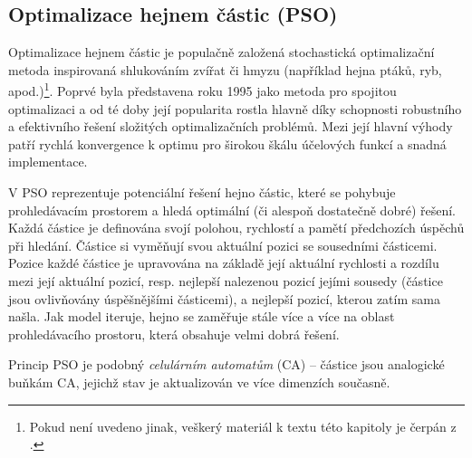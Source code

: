 \documentclass[a4paper,12pt]{article}
\begin{document}
\subsection{Optimalizace hejnem částic (PSO)}
Optimalizace hejnem částic je populačně založená stochastická optimalizační metoda inspirovaná
shlukováním zvířat či hmyzu (například hejna ptáků, ryb, apod.)\footnote{Pokud není uvedeno jinak,
veškerý materiál k textu této kapitoly je čerpán z \cite{Blum08SwarmOpt}.}.
Poprvé byla představena roku 1995 jako metoda pro spojitou optimalizaci a od té doby
její popularita rostla hlavně díky schopnosti robustního a efektivního řešení složitých optimalizačních problémů.
Mezi její hlavní výhody patří rychlá konvergence k optimu pro širokou škálu účelových funkcí a snadná implementace.

V PSO reprezentuje potenciální řešení hejno částic, které se pohybuje prohledávacím prostorem a hledá
optimální (či alespoň dostatečně dobré) řešení. Každá částice je definována svojí polohou, rychlostí a pamětí
předchozích úspěchů při hledání. Částice si vyměňují svou aktuální pozici se sousedními částicemi.
Pozice každé částice je upravována na základě její aktuální rychlosti a rozdílu mezi její aktuální pozicí, resp.
nejlepší nalezenou pozicí jejími sousedy (částice jsou ovlivňovány úspěšnějšími částicemi), a nejlepší pozicí,
kterou zatím sama našla. Jak model iteruje, hejno se zaměřuje stále více a více na oblast prohledávacího
prostoru, která obsahuje velmi dobrá řešení.

Princip PSO je podobný {\it celulárním automatům} (CA) -- částice jsou analogické buňkám CA, jejichž stav je
aktualizován ve více dimenzích současně.
\end{document}
